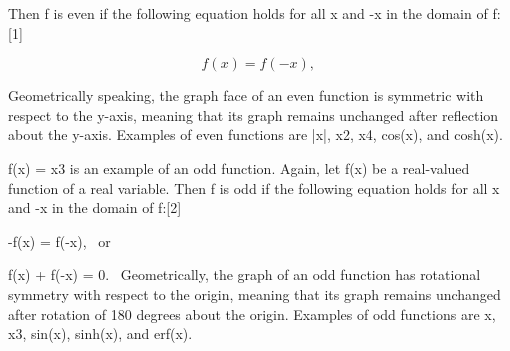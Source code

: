 
Then f is even if the following equation holds for all x and -x in the domain of f:[1]

\[f(x) = f(-x), \,\]

Geometrically speaking, the graph face of an even function is symmetric with respect to the y-axis, meaning that its graph remains unchanged after reflection about the y-axis.
Examples of even functions are |x|, x2, x4, cos(x), and cosh(x).






ƒ(x) = x3 is an example of an odd function.
Again, let f(x) be a real-valued function of a real variable. Then f is odd if the following equation holds for all x and -x in the domain of f:[2]

-f(x) = f(-x), \,
or

f(x) + f(-x) = 0. \,
Geometrically, the graph of an odd function has rotational symmetry with respect to the origin, meaning that its graph remains unchanged after rotation of 180 degrees about the origin.
Examples of odd functions are x, x3, sin(x), sinh(x), and erf(x).
